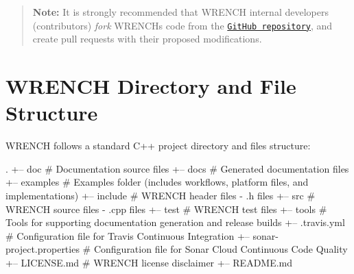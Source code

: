 \begin{quote}
{\bfseries Note\+:} It is strongly recommended that W\+R\+E\+N\+CH internal developers (contributors) {\itshape fork} W\+R\+E\+N\+CH\textquotesingle{}s code from the \href{http://github.com/wrench-project/wrench}{\tt Git\+Hub repository}, and create pull requests with their proposed modifications. \end{quote}
\hypertarget{getting-started_getting-started-structure}{}\section{W\+R\+E\+N\+C\+H Directory and File Structure}\label{getting-started_getting-started-structure}
W\+R\+E\+N\+CH follows a standard C++ project directory and files structure\+:


\begin{DoxyCode}
.
+-- doc                        # Documentation source files
+-- docs                       # Generated documentation files
+-- examples                   # Examples folder (includes workflows, platform files, and implementations) 
+-- include                    # WRENCH header files - .h files 
+-- src                        # WRENCH source files - .cpp files
+-- test                       # WRENCH test files
+-- tools                      # Tools for supporting documentation generation and release builds
+-- .travis.yml                # Configuration file for Travis Continuous Integration
+-- sonar-project.properties   # Configuration file for Sonar Cloud Continuous Code Quality
+-- LICENSE.md                 # WRENCH license disclaimer
+-- README.md
\end{DoxyCode}
 